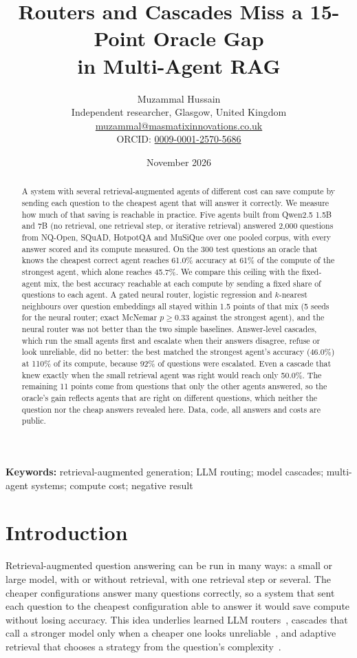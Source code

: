 \documentclass[11pt,a4paper]{article}
\title{\textbf{Routers and Cascades Miss a 15-Point Oracle Gap\\in Multi-Agent RAG}}
\author{Muzammal Hussain\\
\small Independent researcher, Glasgow, United Kingdom\\
\small \href{mailto:muzammal@masmatixinnovations.co.uk}{muzammal@masmatixinnovations.co.uk}\\
\small ORCID: \href{https://orcid.org/0009-0001-2570-5686}{0009-0001-2570-5686}}
\date{\small November 2026}
\begin{document}
\maketitle

\begin{abstract}
\noindent
A system with several retrieval-augmented agents of different cost can save compute by sending each question to the
cheapest agent that will answer it correctly. We measure how much of that saving is reachable in practice. Five agents
built from Qwen2.5 1.5B and 7B (no retrieval, one retrieval step, or iterative retrieval) answered 2,000 questions
from NQ-Open, SQuAD, HotpotQA and MuSiQue over one pooled corpus, with every answer scored and its compute measured.
On the 300 test questions an oracle that knows the cheapest correct agent reaches 61.0\% accuracy at 61\% of the
compute of the strongest agent, which alone reaches 45.7\%. We compare this ceiling with the fixed-agent mix, the
best accuracy reachable at each compute by sending a fixed share of questions to each agent. A gated neural router,
logistic regression and $k$-nearest neighbours over question embeddings all stayed within 1.5 points of that
mix (5 seeds for the neural router; exact McNemar $p \ge 0.33$ against the strongest agent), and the neural router
was not better than the two simple baselines. Answer-level cascades, which run the small agents first and escalate
when their answers disagree, refuse or look unreliable, did no better: the best matched the strongest agent's
accuracy (46.0\%) at 110\% of its compute, because 92\% of questions were escalated. Even a cascade that knew exactly
when the small retrieval agent was right would reach only 50.0\%. The remaining 11 points come from questions that
only the other agents answered, so the oracle's gain reflects agents that are right on different questions, which
neither the question nor the cheap answers revealed here. Data, code, all answers and costs are public.
\end{abstract}

\noindent\textbf{Keywords:} retrieval-augmented generation; LLM routing; model cascades; multi-agent systems; compute cost; negative result

\section{Introduction}

Retrieval-augmented question answering can be run in many ways: a small or large model, with or without retrieval,
with one retrieval step or several. The cheaper configurations answer many questions correctly, so a system that sent
each question to the cheapest configuration able to answer it would save compute without losing accuracy. This idea
underlies learned LLM routers~\cite{ong2024routellm}, cascades that call a stronger model only when a cheaper one
looks unreliable~\cite{chen2023frugalgpt}, and adaptive retrieval that chooses a strategy from the question's
complexity~\cite{jeong2024adaptiverag}.
\end{document}
